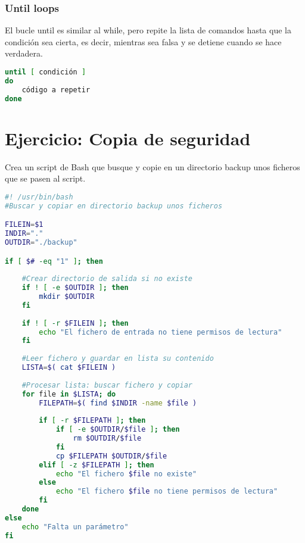 \subsubsection{Until loops}
El bucle until es similar al while, pero repite la lista de comandos hasta que la condición sea cierta, es decir, mientras sea falsa y se detiene cuando se hace verdadera.
\begin{lstlisting}[language = bash]
until [ condición ]
do
	código a repetir
done
\end{lstlisting}

\section{Ejercicio: Copia de seguridad}
Crea un script de Bash que busque y copie en un directorio backup unos ficheros que se pasen al script.

\begin{lstlisting}[language = bash]
#! /usr/bin/bash
#Buscar y copiar en directorio backup unos ficheros

FILEIN=$1
INDIR="."
OUTDIR="./backup"

if [ $# -eq "1" ]; then
	
	#Crear directorio de salida si no existe
	if ! [ -e $OUTDIR ]; then
		mkdir $OUTDIR
	fi
	
	if ! [ -r $FILEIN ]; then
		echo "El fichero de entrada no tiene permisos de lectura"
	fi
	
	#Leer fichero y guardar en lista su contenido
	LISTA=$( cat $FILEIN )
	
	#Procesar lista: buscar fichero y copiar
	for file in $LISTA; do
		FILEPATH=$( find $INDIR -name $file )
		
		if [ -r $FILEPATH ]; then
			if [ -e $OUTDIR/$file ]; then
				rm $OUTDIR/$file
			fi
			cp $FILEPATH $OUTDIR/$file
		elif [ -z $FILEPATH ]; then
			echo "El fichero $file no existe"
		else
			echo "El fichero $file no tiene permisos de lectura"
		fi
	done
else
	echo "Falta un parámetro"
fi
\end{lstlisting}